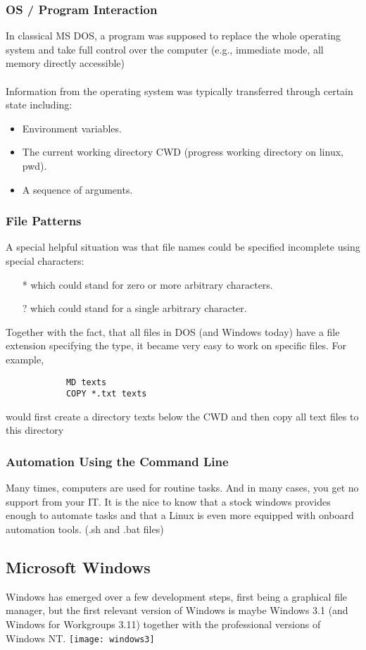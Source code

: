 \documentclass[twocolumn]{article}
\begin{document}
		\subsubsection{OS / Program Interaction}
			In classical MS DOS, a program was supposed to replace the whole operating system and take full control over the computer (e.g., immediate mode, all memory directly accessible)\\\\
			Information from the operating system was typically transferred through certain state including:
			\begin{itemize}
			\item Environment variables.
			\item The current working directory CWD (progress working directory on linux, pwd).
			\item A sequence of arguments.
			\end{itemize}
		\subsubsection{File Patterns}
			A special helpful situation was that file names could be specified incomplete using special characters:
			\begin{itemize}
			\item[*] which could stand for zero or more arbitrary characters.
			\item[?] which could stand for a single arbitrary character.
			\end{itemize}
			Together with the fact, that all files in DOS (and Windows today) have a file extension specifying the type, it became very easy to work on specific files. For example,
			\begin{verbatim}
			MD texts
			COPY *.txt texts
			\end{verbatim}
			would first create a directory texts below the CWD and then copy all text files to this directory
		\subsubsection{Automation Using the Command Line}
			Many times, computers are used for routine tasks. And in many cases, you get no support from your IT. It is the nice to know that a stock windows provides enough to automate tasks and that a Linux is even more equipped with onboard automation tools. (.sh and .bat files)
	\subsection{Microsoft Windows}
		Windows has emerged over a few development steps, first being a graphical file manager, but the first relevant version of Windows is maybe Windows 3.1 (and Windows for Workgroups 3.11) together with the professional versions of Windows NT.
		\texttt{[image: windows3]}
\end{document}

